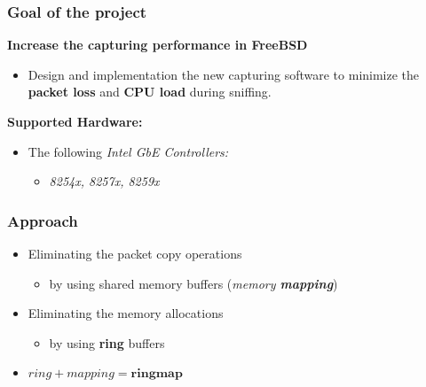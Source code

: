 \begin{frame}
\frametitle{Goal of the project}
\textbf{Increase the capturing performance in FreeBSD}
	\begin{itemize}
		\item Design and implementation the new capturing software to
			minimize the \textbf{packet loss} and \textbf{CPU load} during sniffing.\newline
	\end{itemize}
\textbf{Supported Hardware:}
\begin{itemize}
	\item The following \emph{Intel GbE Controllers:}
		\begin{itemize}
			\item \small{\emph{8254x, 8257x, 8259x}}
		\end{itemize}
\end{itemize}
\end{frame}

\begin{frame}
\frametitle{Approach}
\begin{itemize}
	\item<1-> Eliminating the packet copy operations
		\begin{itemize}
			\item<1-> by using shared memory buffers (\emph{memory \textbf{mapping}})
		\end{itemize}
	\item<2-> Eliminating the memory allocations
		\begin{itemize}
			\item<2-> by using \textbf{ring} buffers
		\end{itemize}
	\item<3->[$\Rightarrow$] $ring + mapping = \textbf{ringmap}$
\end{itemize}
\end{frame}


